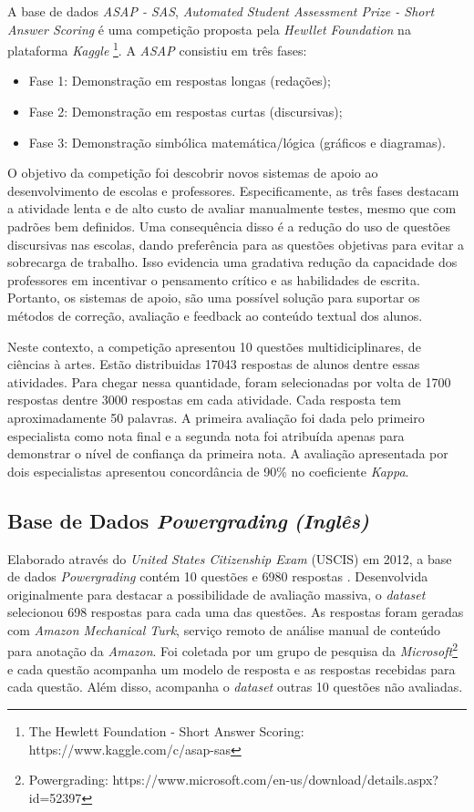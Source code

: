 A base de dados \textit{ASAP - SAS}, \textit{Automated Student Assessment Prize - Short Answer Scoring} é uma competição proposta pela \textit{Hewllet Foundation} na plataforma \textit{Kaggle} \footnote{The Hewlett Foundation - Short Answer Scoring: https://www.kaggle.com/c/asap-sas}. A \textit{ASAP} consistiu em três fases:

\begin{itemize}
\item Fase 1:  Demonstração em respostas longas (redações); 
\item Fase 2:  Demonstração em respostas curtas (discursivas);
\item Fase 3:  Demonstração simbólica matemática/lógica (gráficos e diagramas).
\end{itemize}

O objetivo da competição foi descobrir novos sistemas de apoio ao desenvolvimento de escolas e professores. Especificamente, as três fases destacam a atividade lenta e de alto custo de avaliar manualmente testes, mesmo que com padrões bem definidos. Uma consequência disso é a redução do uso de questões discursivas nas escolas, dando preferência para as questões objetivas para evitar a sobrecarga de trabalho. Isso evidencia uma gradativa redução da capacidade dos professores em incentivar o pensamento crítico e as habilidades de escrita. Portanto, os sistemas de apoio, são uma possível solução para suportar os métodos de correção, avaliação e feedback ao conteúdo textual dos alunos.

Neste contexto, a competição apresentou 10 questões multidiciplinares, de ciências à artes. Estão distribuidas 17043 respostas de alunos dentre essas atividades. Para chegar nessa quantidade, foram selecionadas por volta de 1700 respostas dentre 3000 respostas em cada atividade. Cada resposta tem aproximadamente 50 palavras. A primeira avaliação foi dada pelo primeiro especialista como nota final e a segunda nota foi atribuída apenas para demonstrar o nível de confiança da primeira nota. A avaliação apresentada por dois especialistas apresentou concordância de 90\% no coeficiente \textit{Kappa}.


\subsection{Base de Dados \textit{Powergrading} \textit{(Inglês)}}
\label{powergrading-db}
Elaborado através do \textit{United States Citizenship Exam} (USCIS) em 2012, a base de dados \textit{Powergrading} contém 10 questões e 6980 respostas \cite{basu2013}. Desenvolvida originalmente para destacar a possibilidade de avaliação massiva, o \textit{dataset} selecionou 698 respostas para cada uma das questões. As respostas foram geradas com \textit{Amazon Mechanical Turk}, serviço remoto de análise manual de conteúdo para anotação da \textit{Amazon}. Foi coletada por um grupo de pesquisa da \textit{Microsoft}\footnote{Powergrading: https://www.microsoft.com/en-us/download/details.aspx?id=52397} e cada questão acompanha um modelo de resposta e as respostas recebidas para cada questão.  Além disso, acompanha o \textit{dataset} outras 10 questões não avaliadas.

